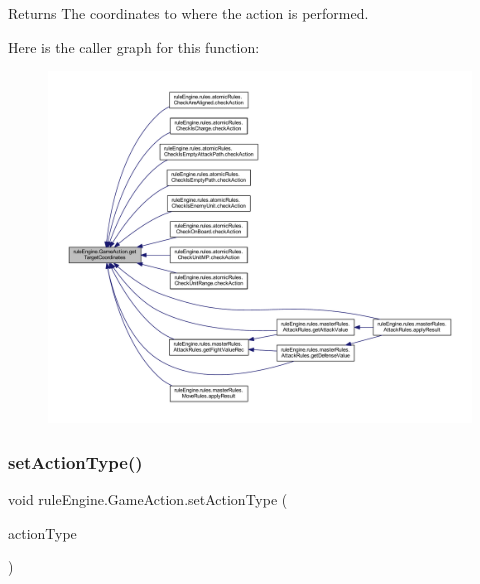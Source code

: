 \begin{DoxyReturn}{Returns}
The coordinates to where the action is performed. 
\end{DoxyReturn}
Here is the caller graph for this function\+:
\nopagebreak
\begin{figure}[H]
\begin{center}
\leavevmode
\includegraphics[width=350pt]{classrule_engine_1_1_game_action_ade50aef53ec161c2f0976f38d1ed006c_icgraph}
\end{center}
\end{figure}
\mbox{\label{classrule_engine_1_1_game_action_a3337a150ac049db623ec6e96dcfa3ff3}} 
\subsubsection{\texorpdfstring{set\+Action\+Type()}{setActionType()}}
{\footnotesize\ttfamily void rule\+Engine.\+Game\+Action.\+set\+Action\+Type (\begin{DoxyParamCaption}\item[{\mbox{\hyperlink{enumrule_engine_1_1_e_game_action_type}{E\+Game\+Action\+Type}}}]{action\+Type }\end{DoxyParamCaption})\hspace{0.3cm}{\ttfamily [inline]}}


